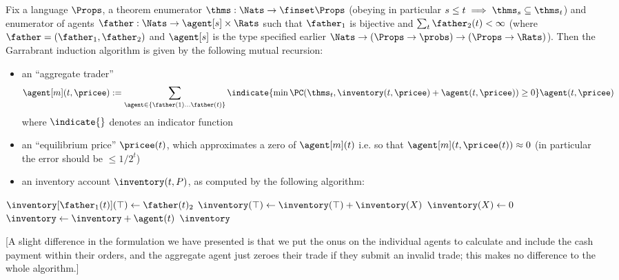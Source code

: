 \begin{subappendices}
\begin{definition}
    Fix a language $\Props$, a theorem enumerator $\thms:\Nats\to\finset\Props$ (obeying in particular $s\le t\implies\thms_s\subseteq\thms_t$) and enumerator of agents $\father:\Nats\to\agent[s]\times\Rats$ such that $\father_1$ is bijective and $\sum_t\father_2(t)<\infty$ (where $\father=(\father_1,\father_2)$ and $\agent[s]$ is the type specified earlier $\Nats\to(\Props\to\probs)\to(\Props\to\Rats)$). Then the Garrabrant induction algorithm is given by the following mutual recursion:
    \begin{itemize}
        \item an ``aggregate trader'' $$\agent[m](t,\pricee):=\sum_{\agent\in\{\father(1)\dots\father(t)\}}\indicate{\min\PC(\thms_t,\inventory(t,\pricee) + \agent(t,\pricee))\ge 0}\agent(t,\pricee)$$ where $\indicate{}$ denotes an indicator function
        \item an ``equilibrium price'' $\pricee(t)$, which approximates a zero of $\agent[m](t)$ i.e. so that $\agent[m](t,\pricee(t))\approx 0$ (in particular the error should be $\le 1/2^t$)
        \item an inventory account $\inventory(t,P)$, as computed by the following algorithm:
    \end{itemize}

    \begin{algorithm}
    \begin{algorithmic}
    \Function{$\inventory$}{$\tau$}
            \State $\inventory[\father_1(t)](\top)\gets\father(t)_2$
             
                    \State $\inventory(\top) \gets \inventory(\top)+\inventory(X)$
                    \State $\inventory(X)\gets 0$
                \EndIf
            \EndFor
                    \State $\inventory\gets\inventory+\agent(t)$ 
                \EndIf
            \EndFor
        \EndFor
        \State \Return $\inventory$
    \EndFunction
    \end{algorithmic}
    \end{algorithm}
    \label{nonvf:def:garrabrant}
\end{definition}

[A slight difference in the formulation we have presented is that we put the onus on the individual agents to calculate and include the cash payment within their orders, and the aggregate agent just zeroes their trade if they submit an invalid trade; this makes no difference to the whole algorithm.]


\end{subappendices}
